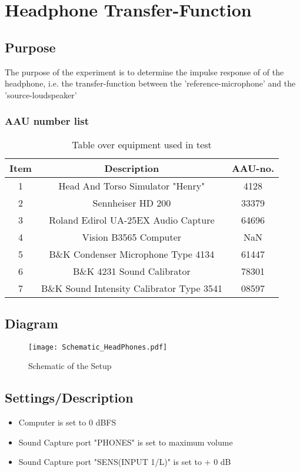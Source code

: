 \section{Headphone Transfer-Function}
\subsection{Purpose}
The purpose of the experiment is to determine the impulse response of of the  headphone, i.e. the transfer-function between the 'reference-microphone' and the 'source-loudspeaker'

\subsubsection{AAU number list}
\begin{table}[h]
	\centering
	\begin{tabular}{ c c c } \toprule
		{Item}	& {Description} 						& {AAU-no.} \\ \bottomrule 
		1		&	Head And Torso Simulator "Henry"	& 4128		\\
		2		& 	Sennheiser HD 200					& 33379		\\
		3		&	Roland Edirol UA-25EX Audio Capture	& 64696		\\
		4		&	Vision B3565 Computer				& NaN		\\  
		5		&	B\&K Condenser Microphone Type 4134	& 61447		\\
		6		&	B\&K 4231 Sound Calibrator			& 78301		\\ 		7		&	B\&K Sound Intensity Calibrator Type 3541	& 08597	\\ \bottomrule
	\end{tabular}
	\caption{Table over equipment used in test}
	\label{tab:UsedEquipmentListning2}
\end{table}

\subsection{Diagram}
\begin{figure}[H]
	\centering
	\texttt{[image: Schematic\_HeadPhones.pdf]}
	\caption{Schematic of the Setup}
	\label{Schematic}
\end{figure}

\subsection{Settings/Description}
\begin{itemize}
	\item Computer is set to 0 dBFS
	\item Sound Capture port "PHONES" is set to maximum volume
	\item Sound Capture port "SENS(INPUT 1/L)" is set to + 0 dB
\end{itemize}

